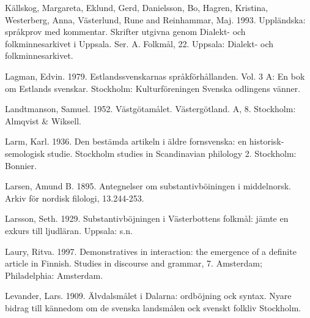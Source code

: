 \begin{styleBodytextC}
Källskog, Margareta, Eklund, Gerd, Danielsson, Bo, Hagren, Kristina, Westerberg, Anna, Västerlund, Rune and Reinhammar, Maj. 1993. Uppländska: språkprov med kommentar. Skrifter utgivna genom Dialekt- och folkminnesarkivet i Uppsala. Ser. A. Folkmål, 22. Uppsala: Dialekt- och folkminnesarkivet.

\end{styleBodytextC}

\begin{styleBodytextC}
Lagman, Edvin. 1979. Estlandssvenskarnas språkförhållanden. Vol. 3 A: En bok om Estlands svenskar. Stockholm: Kulturföreningen Svenska odlingens vänner.

\end{styleBodytextC}

\begin{styleBodytextC}
Landtmanson, Samuel. 1952. Västgötamålet. Västergötland. A, 8. Stockholm: Almqvist \& Wiksell.

\end{styleBodytextC}

\begin{styleBodytextC}
Larm, Karl. 1936. Den bestämda artikeln i äldre fornsvenska: en historisk-semologisk studie. Stockholm studies in Scandinavian philology 2. Stockholm: Bonnier.

\end{styleBodytextC}

\begin{styleBodytextC}
Larsen, Amund B. 1895. Antegnelser om substantivböiningen i middelnorsk. Arkiv för nordisk filologi, 13.244-253.

\end{styleBodytextC}

\begin{styleBodytextC}
Larsson, Seth. 1929. Substantivböjningen i Västerbottens folkmål: jämte en exkurs till ljudläran. Uppsala: s.n.

\end{styleBodytextC}

\begin{styleBodytextC}
Laury, Ritva. 1997. Demonstratives in interaction: the emergence of a definite article in Finnish. Studies in discourse and grammar, 7. Amsterdam; Philadelphia: Amsterdam.

\end{styleBodytextC}

\begin{styleBodytextC}
Levander, Lars. 1909. Älvdalsmålet i Dalarna: ordböjning ock syntax. Nyare bidrag till kännedom om de svenska landsmålen ock svenskt folkliv Stockholm.

\end{styleBodytextC}

